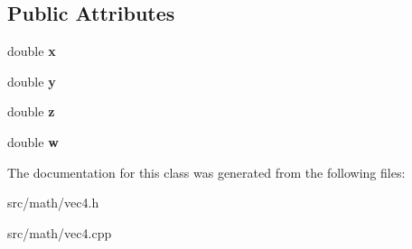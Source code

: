 \subsection*{Public Attributes}
\begin{DoxyCompactItemize}
\item 
\hypertarget{classmath_1_1vec4_a2344d68c0f05c9a0adcaad0a4a7f0e26}{
double {\bfseries x}}
\label{classmath_1_1vec4_a2344d68c0f05c9a0adcaad0a4a7f0e26}

\item 
\hypertarget{classmath_1_1vec4_ae2651523fdafd9851692b6a4639bb10e}{
double {\bfseries y}}
\label{classmath_1_1vec4_ae2651523fdafd9851692b6a4639bb10e}

\item 
\hypertarget{classmath_1_1vec4_ac8cd35d182c03a82f804869caf648240}{
double {\bfseries z}}
\label{classmath_1_1vec4_ac8cd35d182c03a82f804869caf648240}

\item 
\hypertarget{classmath_1_1vec4_a5b3f1ddba8d981ea7f1d741af5375050}{
double {\bfseries w}}
\label{classmath_1_1vec4_a5b3f1ddba8d981ea7f1d741af5375050}

\end{DoxyCompactItemize}


The documentation for this class was generated from the following files:\begin{DoxyCompactItemize}
\item 
src/math/vec4.h\item 
src/math/vec4.cpp\end{DoxyCompactItemize}
